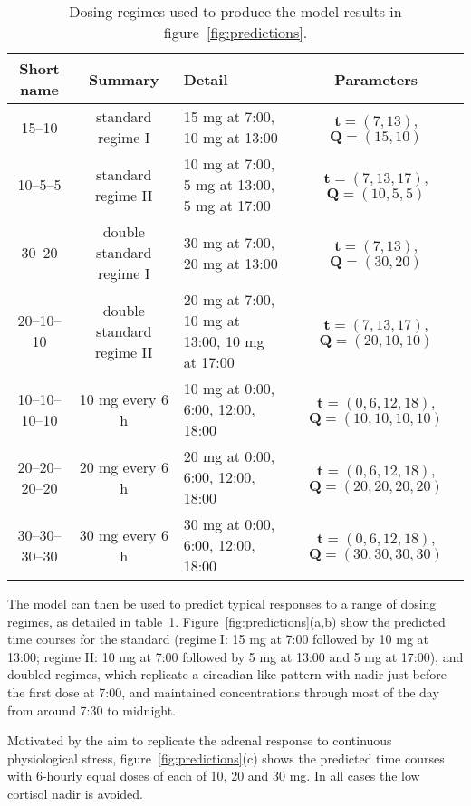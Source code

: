 \documentclass[12pt,a4paper]{article}
\begin{document}
\begin{table}
    \centering
    \begin{tabular}{cc>{\raggedright}p{2.75cm}c}
        Short name & Summary & Detail & Parameters \\\hline
        15--10 & standard regime I  & 15 mg at 7:00, 10 mg at 13:00 & \(\bm{t}=(7,13)\), \(\bm{Q}=(15,10)\)\\
        10--5--5 & standard regime II & 10 mg at 7:00, 5 mg at 13:00, 5 mg at 17:00 & \(\bm{t}=(7,13,17)\), \(\bm{Q}=(10,5,5)\) \\
        30--20     & double standard regime I  & 30 mg at 7:00, 20 mg at 13:00 & \(\bm{t}=(7,13)\), \(\bm{Q}=(30,20)\) \\
        20--10--10 & double standard regime II & 20 mg at 7:00, 10 mg at 13:00, 10 mg at 17:00 & \(\bm{t}=(7,13,17)\), \(\bm{Q}=(20,10,10)\) \\
        10--10--10--10 & 10 mg every 6 h &  10 mg at 0:00, 6:00, 12:00, 18:00 & \(\bm{t}=(0,6,12,18)\), \(\bm{Q}=(10,10,10,10)\) \\
        20--20--20--20 & 20 mg every 6 h &  20 mg at 0:00, 6:00, 12:00, 18:00 & \(\bm{t}=(0,6,12,18)\), \(\bm{Q}=(20,20,20,20)\) \\
        30--30--30--30 & 30 mg every 6 h &  30 mg at 0:00, 6:00, 12:00, 18:00 & \(\bm{t}=(0,6,12,18)\), \(\bm{Q}=(30,30,30,30)\)
    \end{tabular}
    \caption{Dosing regimes used to produce the model results in figure~\ref{fig:predictions}.}
    \label{tab:regimes}
\end{table}

The model can then be used to predict typical responses to a range of dosing regimes, as detailed in table~\ref{tab:regimes}. Figure~\ref{fig:predictions}(a,b) show the predicted time courses for the standard (regime I: 15 mg at 7:00 followed by 10 mg at 13:00; regime II: 10 mg at 7:00 followed by 5 mg at 13:00 and 5 mg at 17:00), and doubled regimes, which replicate a circadian-like pattern with nadir just before the first dose at 7:00, and maintained concentrations through most of the day from around 7:30 to midnight. 

Motivated by the aim to replicate the adrenal response to continuous physiological stress, figure~\ref{fig:predictions}(c) shows the predicted time courses with 6-hourly equal doses of each of 10, 20 and 30 mg. In all cases the low cortisol nadir is avoided.
\end{document}
